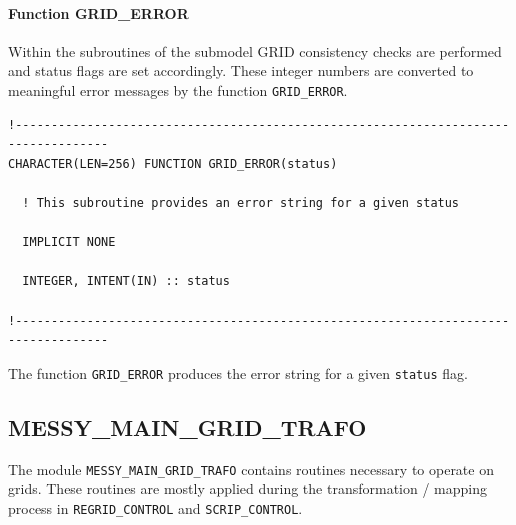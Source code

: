 \documentclass[11pt,twoside]{article}
\begin{document}
\paragraph{Function GRID\_ERROR\\ \label{GRIDERR}}
Within the subroutines of the submodel GRID consistency checks are
 performed and status flags are set accordingly. These integer numbers are
converted to meaningful error messages by the function \verb|GRID_ERROR|.
\begin{verbatim}
!-----------------------------------------------------------------------------------
CHARACTER(LEN=256) FUNCTION GRID_ERROR(status)

  ! This subroutine provides an error string for a given status

  IMPLICIT NONE
     
  INTEGER, INTENT(IN) :: status

!-----------------------------------------------------------------------------------
\end{verbatim}
 The function \verb|GRID_ERROR| produces the error string for a given
\verb|status| flag.
\clearpage
\subsection{MESSY\_MAIN\_GRID\_TRAFO \label{MMGT}}

The module \verb|MESSY_MAIN_GRID_TRAFO| contains routines
necessary to operate on grids. These routines are mostly applied during 
the transformation / mapping process in \verb|REGRID_CONTROL|
and \verb|SCRIP_CONTROL|.
\end{document}
